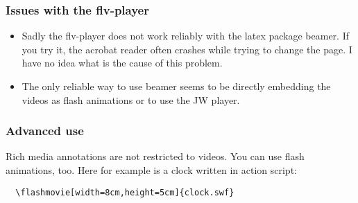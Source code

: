 \documentclass[10pt]{beamer}
\def\myblank{0}
\begin{document}

\begin{frame}[fragile]

\frametitle{Issues with the flv-player}

\begin{itemize}

\item Sadly the flv-player does not work reliably with the latex package
beamer. If you try it, the acrobat reader often crashes while trying
to change the page. I have no idea what is the cause of this problem.

\item The only reliable way to use beamer seems to be directly embedding the videos as
      flash animations or to use the JW player.

\end{itemize}

\end{frame}


\begin{frame}[fragile]

\frametitle{Advanced use}

Rich media annotations are not restricted to videos.
You can use flash animations, too.
Here for example is a clock written in action script:

\flashmovie[width=8cm,height=5cm,blank=\myblank]{clock.swf}

\begin{verbatim}
  \flashmovie[width=8cm,height=5cm]{clock.swf}
\end{verbatim}

\end{frame}

\end{document}

